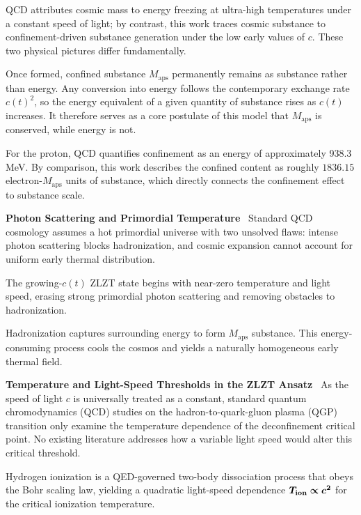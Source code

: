 \documentclass[12pt,leqno]{article}
\begin{document}
{	\medskip
	QCD attributes cosmic mass to energy freezing at ultra-high temperatures under a constant speed of light; by contrast, this work traces cosmic substance to confinement-driven substance generation under the low early values of $c$. These two physical pictures differ fundamentally.
	
	\medskip
	Once formed, confined substance $M_{\mathrm{aps}}$ permanently remains as substance rather than energy. Any conversion into energy follows the contemporary exchange rate $c(t)^2$, so the energy equivalent of a given quantity of substance rises as $c(t)$ increases. It therefore serves as a core postulate of this model that $M_{\mathrm{aps}}$ is conserved, while energy is not.
	
	\medskip
	For the proton, QCD quantifies confinement as an energy of approximately 938.3 MeV. By comparison, this work describes the confined content as roughly  $\boldsymbol{1836.15}$ electron-$M_{\mathrm{aps}}$ units of substance, which directly connects the confinement effect to substance scale.
	
	
	\medskip
	\bigskip
	\textbf{Photon Scattering and Primordial Temperature}\,\,\,
	Standard QCD cosmology assumes a hot primordial universe with two unsolved flaws: intense photon scattering blocks hadronization, and cosmic expansion cannot account for uniform early thermal distribution.
	
	\medskip
	The growing-$c(t)$ ZLZT state begins with near-zero temperature and light speed, erasing strong primordial photon scattering and removing obstacles to hadronization.
	
	\medskip
	Hadronization captures surrounding energy to form $M_{\mathrm{aps}}$ substance. This energy-consuming process cools the cosmos and yields a naturally homogeneous early thermal field.
	
	
	\medskip
	\bigskip
	\textbf{Temperature and Light-Speed Thresholds in the ZLZT Ansatz}\,\,\,
	As the speed of light $c$ is universally treated as a constant, standard quantum chromodynamics (QCD) studies on the hadron-to-quark-gluon plasma (QGP) transition only examine the temperature dependence of the deconfinement critical point. No existing literature addresses how a variable light speed would alter this critical threshold.
	
	\medskip
	Hydrogen ionization is a QED-governed two-body dissociation process that obeys the Bohr scaling law, yielding a quadratic light-speed dependence  $\boldsymbol{T_{\rm ion} \propto c^2}$ for the critical ionization temperature.
	
}
\end{document}
